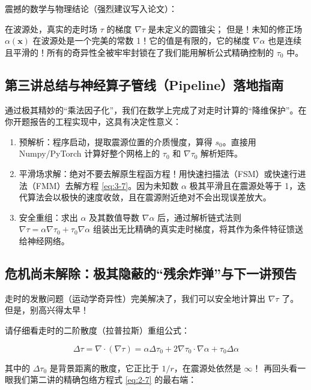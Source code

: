 \documentclass[12pt]{article}
\begin{document}
{震撼的数学与物理结论（强烈建议写入论文）：

在波源处，真实的走时场 $\tau$ 的梯度 $\nabla \tau$ 是未定义的圆锥尖；
但是！未知的修正场 $\alpha(\mathbf{x})$ 在波源处是一个完美的常数 1！它的值是有限的，它的梯度 $\nabla \alpha$ 也是连续且平滑的！所有的奇异性全被牢牢封锁在了我们能用解析公式精确控制的 $\tau_0$ 中。

\subsection{第三讲总结与神经算子管线（Pipeline）落地指南}

通过极其精妙的“乘法因子化”，我们在数学上完成了对走时计算的“降维保护”。在你开题报告的工程实现中，这具有决定性意义：

\begin{enumerate}[leftmargin=2em]
    \item 预解析：程序启动，提取震源位置的介质慢度，算得 $s_0$。直接用 Numpy/PyTorch 计算好整个网格上的 $\tau_0$ 和 $\nabla \tau_0$ 解析矩阵。
    \item 平滑场求解：绝对不要去解原生程函方程！用快速扫描法（FSM）或快速行进法（FMM）去解方程 \eqref{eq:3-7}。因为未知数 $\alpha$ 极其平滑且在震源处等于 1，迭代算法会以极快的速度收敛，且在震源附近绝对不会出现误差放大。
    \item 安全重组：求出 $\alpha$ 及其数值导数 $\nabla \alpha$ 后，通过解析链式法则 $\nabla \tau = \alpha \nabla \tau_0 + \tau_0 \nabla \alpha$ 组装出无比精确的真实走时梯度，将其作为条件特征馈送给神经网络。
\end{enumerate}

\subsection{危机尚未解除：极其隐蔽的“残余炸弹”与下一讲预告}

走时的发散问题（运动学奇异性）完美解决了，我们可以安全地计算出 $\nabla \tau$ 了。
但是，别高兴得太早！

请仔细看走时的二阶散度（拉普拉斯）重组公式：

\begin{equation}
\Delta \tau = \nabla \cdot (\nabla \tau) = \alpha \Delta \tau_0 + 2 \nabla \tau_0 \cdot \nabla \alpha + \tau_0 \Delta \alpha
\label{eq:3-laplacian-reconstruct}
\end{equation}

其中的 $\Delta \tau_0$ 是背景距离的散度，它正比于 $1/r$，在震源处依然是 $\infty$！
再回头看一眼我们第二讲的精确包络方程式 \eqref{eq:2-7} 的最右端：

}
\end{document}
